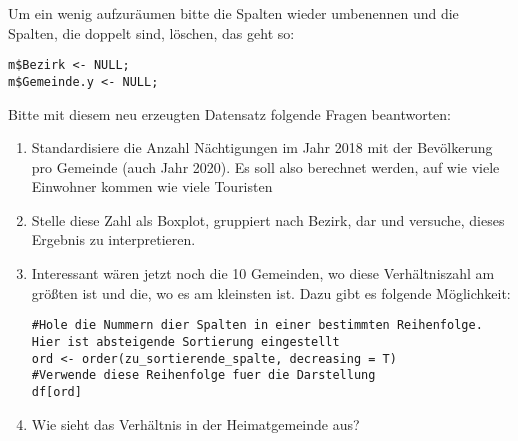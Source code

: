 \documentclass{article}
\begin{document}
Um ein wenig aufzuräumen bitte die Spalten wieder umbenennen und die Spalten, die doppelt sind, löschen, das geht so:

\begin{lstlisting}
m$Bezirk <- NULL;
m$Gemeinde.y <- NULL;
\end{lstlisting}

Bitte mit diesem neu erzeugten Datensatz folgende Fragen beantworten:

\begin{enumerate}
	\item Standardisiere die Anzahl Nächtigungen im Jahr 2018 mit der Bevölkerung pro Gemeinde (auch Jahr 2020). Es soll also berechnet werden, auf wie viele Einwohner kommen wie viele Touristen
	\item Stelle diese Zahl als Boxplot, gruppiert nach Bezirk, dar und versuche, dieses Ergebnis zu interpretieren.
	\item Interessant wären jetzt noch die 10 Gemeinden, wo diese Verhältniszahl am größten ist und die, wo es am kleinsten ist. Dazu gibt es folgende Möglichkeit:
	
\begin{lstlisting}
#Hole die Nummern dier Spalten in einer bestimmten Reihenfolge. Hier ist absteigende Sortierung eingestellt
ord <- order(zu_sortierende_spalte, decreasing = T)
#Verwende diese Reihenfolge fuer die Darstellung
df[ord]
\end{lstlisting}	
	
	\item Wie sieht das Verhältnis in der Heimatgemeinde aus?
\end{enumerate}
\end{document}
